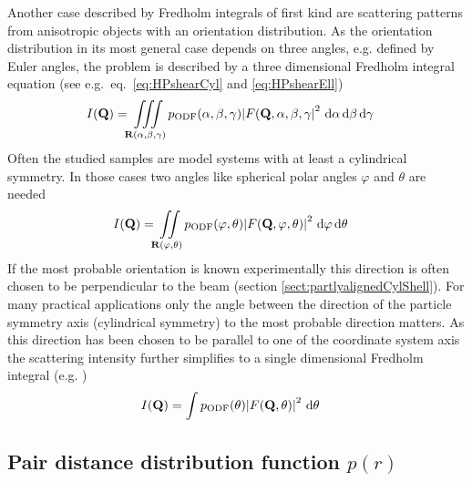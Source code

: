 Another case described by Fredholm integrals of first kind are scattering patterns from anisotropic objects with an orientation distribution. As the orientation distribution in its most general case depends on three angles, e.g. defined by Euler angles, the problem is described by a three dimensional Fredholm integral equation (see e.g.\ eq.\ \ref{eq:HPshearCyl} and \ref{eq:HPshearEll})
\begin{align}\label{eq:FE4ODF_3D}
  I(\mathbf{Q}) &=  \iiint\limits_{\mathbf{R}(\alpha,\beta,\gamma)} p_\mathrm{ODF}(\alpha,\beta,\gamma) {\left\vert F(\mathbf{Q},\alpha,\beta,\gamma\right\vert}^2\,\, \mathrm{d}\alpha\, \mathrm{d}\beta\, \mathrm{d}\gamma
\end{align}
Often the studied samples are model systems with at least a cylindrical symmetry. In those cases two angles like spherical polar angles $\varphi$ and $\theta$ are needed
\begin{align}\label{eq:FE4ODF_2D}
  I(\mathbf{Q}) &=  \iint\limits_{\mathbf{R}(\varphi,\theta)} p_\mathrm{ODF}(\varphi,\theta) {\left\vert F(\mathbf{Q},\varphi,\theta)\right\vert}^2\,\, \mathrm{d}\varphi\, \mathrm{d}\theta
\end{align}
If the most probable orientation is known experimentally this direction is often chosen to be perpendicular to the beam (section \ref{sect:partlyalignedCylShell}). For many practical applications only the angle between the direction of the particle symmetry axis (cylindrical symmetry) to the most probable direction matters. As this direction has been chosen to be parallel to one of the coordinate system axis the scattering intensity further simplifies to a single dimensional Fredholm integral (e.g. \cite{Beck2010})
\begin{align}\label{eq:FE4ODF_1D}
  I(\mathbf{Q}) &=  \int  p_\mathrm{ODF}(\theta) {\left\vert F(\mathbf{Q},\theta)\right\vert}^2\,\, \mathrm{d}\theta
\end{align}
\subsection{Pair distance distribution function $p(r)$}~\\
\label{sec:p(r)}

